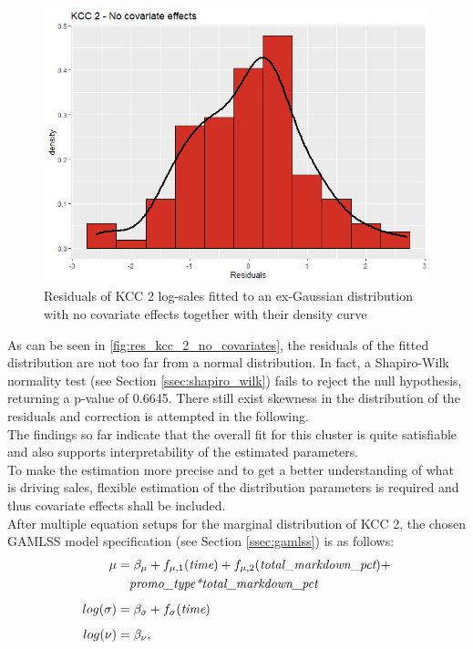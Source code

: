 \begin{figure}[H]
\centering
  \includegraphics[width=0.45\linewidth]{figures/res_kcc_2_no_covariates.png}
  \caption{Residuals of KCC 2 log-sales fitted to an ex-Gaussian distribution with no covariate effects together with their density curve}
  \label{fig:res_kcc_2_no_covariates}
\end{figure}

As can be seen in \autoref{fig:res_kcc_2_no_covariates}, the residuals of the fitted distribution are not too far from a normal distribution. 
In fact, a Shapiro-Wilk normality test (see Section \ref{ssec:shapiro_wilk}) fails to reject the null hypothesis, returning a p-value of 0.6645.
There still exist skewness in the distribution of the residuals and correction is attempted in the following. 
\\

The findings so far indicate that the overall fit for this cluster is quite satisfiable and also supports interpretability of the estimated parameters. \\
To make the estimation more precise and to get a better understanding of what is driving sales, flexible estimation of the distribution parameters is required and thus covariate effects shall be included. \\
After multiple equation setups for the marginal distribution of \ac{KCC} 2, the chosen \ac{GAMLSS} model specification (see Section \ref{ssec:gamlss}) is as follows:
\begin{equation}
\begin{aligned}
\mu &= \beta_{\mu} + f_{\mu , 1}(\textit{time}) + f_{\mu ,2}(\textit{total\_markdown\_pct}) + \\
 & \quad \textit{promo\_type*total\_markdown\_pct} \\ \noalign{\vskip5pt}
log(\sigma) &= \beta_{\sigma} + f_{\sigma}(\textit{time}) \\ \noalign{\vskip5pt}
log(\nu) &=  \beta_{\nu}, 
\end{aligned}
\label{eq:gamlss_kcc_2}
\end{equation} 

